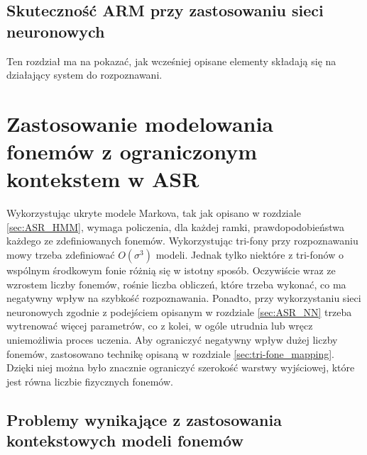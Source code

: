 \documentclass[11pt]{article}
\begin{document}
	\subsection{Skuteczność ARM przy zastosowaniu sieci neuronowych}
	
	Ten rozdział ma na pokazać, jak wcześniej opisane elementy składają się na działający system do rozpoznawani.

\section{ Zastosowanie modelowania fonemów z ograniczonym kontekstem w ASR }	
	Wykorzystując ukryte modele Markova, tak jak opisano w rozdziale \ref{sec:ASR_HMM}, wymaga policzenia, dla każdej ramki, prawdopodobieństwa każdego ze zdefiniowanych fonemów. Wykorzystując tri-fony przy rozpoznawaniu mowy trzeba zdefiniować $O(\sigma^3)$ modeli. Jednak tylko niektóre z tri-fonów o wspólnym środkowym fonie różnią się w istotny sposób. Oczywiście wraz ze wzrostem liczby fonemów, rośnie liczba obliczeń, które trzeba wykonać, co ma negatywny wpływ na szybkość rozpoznawania. Ponadto, przy wykorzystaniu sieci neuronowych zgodnie z podejściem opisanym w rozdziale \ref{sec:ASR_NN} trzeba wytrenować więcej parametrów, co z kolei, w ogóle utrudnia lub wręcz uniemożliwia proces uczenia. Aby ograniczyć negatywny wpływ dużej liczby fonemów, zastosowano technikę opisaną w rozdziale \ref{sec:tri-fone_mapping}. Dzięki niej można było znacznie ograniczyć szerokość warstwy wyjściowej, które jest równa liczbie fizycznych fonemów.
	
	\subsection{ Problemy wynikające z zastosowania kontekstowych modeli fonemów }
\end{document}

